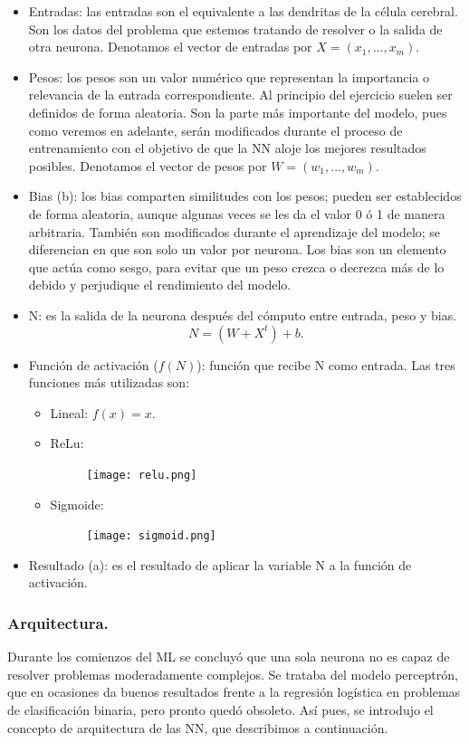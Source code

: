 \documentclass[a4paper,11pt]{article}
\begin{document}
\begin{itemize}
    \item Entradas: las entradas son el equivalente a las dendritas de la célula cerebral. Son los datos del problema que estemos tratando de resolver o la salida de otra neurona. Denotamos el vector de entradas por $X=(x_1,...,x_m)$.
    \item Pesos: los pesos son un valor numérico que representan la importancia o relevancia de la entrada correspondiente. Al principio del ejercicio suelen ser definidos de forma aleatoria. Son la parte más importante del modelo, pues como veremos en adelante, serán modificados durante el proceso de entrenamiento con el objetivo de que la NN aloje los mejores resultados posibles. Denotamos el vector de pesos por $W=(w_1,...,w_m)$.
    \item Bias (b): los bias comparten similitudes con los pesos; pueden ser establecidos de forma aleatoria, aunque algunas veces se les da el valor 0 ó 1 de manera arbitraria. También son modificados durante el aprendizaje del modelo; se diferencian en que son solo un valor por neurona. Los bias son un elemento que actúa como sesgo, para evitar que un peso crezca o decrezca más de lo debido y perjudique el rendimiento del modelo.
    \item N: es la salida de la neurona después del cómputo entre entrada, peso y bias.\\                                           \[N=(W+X^t)+b.\]
    \item Función de activación ($f(N)$): función que recibe N como entrada. Las tres funciones más utilizadas son:
    \begin{itemize}
    \item Lineal: $f(x)=x.$ 
    \item ReLu: 		\begin{figure}[H]
				\centering
				\texttt{[image: relu.png]}
				\end{figure}
    \item Sigmoide: 	\begin{figure}[H]
				\centering
				\texttt{[image: sigmoid.png]}
				\end{figure}
	
    \end{itemize}
    \item Resultado (a): es el resultado de aplicar la variable N a la función de activación.
        
\end{itemize}
\subsubsection{Arquitectura.}
Durante los comienzos del ML se concluyó que una sola neurona no es capaz de
resolver problemas moderadamente complejos. Se trataba del modelo perceptrón,
que en ocasiones da buenos resultados frente a la regresión logística en problemas
de clasificación binaria, pero pronto quedó obsoleto. Así pues, se introdujo el
concepto de arquitectura de las NN, que describimos a continuación.\\
\end{document}
